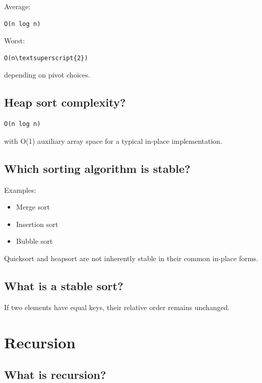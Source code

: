 Average:

\begin{lstlisting}
O(n log n)
\end{lstlisting}

Worst:

\begin{lstlisting}
O(n\textsuperscript{2})
\end{lstlisting}

depending on pivot choices.

\medskip

\subsection{Heap sort complexity?}

\begin{lstlisting}
O(n log n)
\end{lstlisting}

with O(1) auxiliary array space for a typical in-place implementation.

\medskip

\subsection{Which sorting algorithm is stable?}

Examples:

\begin{itemize}
  \item Merge sort
  \item Insertion sort
  \item Bubble sort
\end{itemize}

Quicksort and heapsort are not inherently stable in their common in-place forms.

\medskip

\subsection{What is a stable sort?}

If two elements have equal keys, their relative order remains unchanged.

\medskip

\section{Recursion}

\subsection{What is recursion?}

